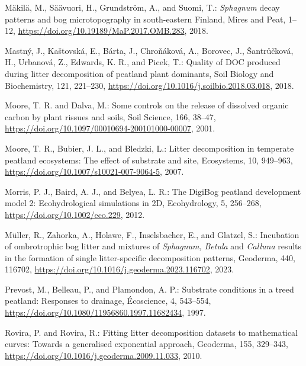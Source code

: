 \documentclass[
  12pt,
]{article}
\newlength{\cslhangindent}
\newlength{\cslentryspacingunit} %
\newenvironment{CSLReferences}[2] %
 {%
  \setlength{\parindent}{0pt}
  \ifodd #1
  \let\oldpar\par
  \def\par{\hangindent=\cslhangindent\oldpar}
  \fi
  \setlength{\parskip}{#2\cslentryspacingunit}
 }%
 {}
\begin{document}
\begin{CSLReferences}{0}{0}
\leavevmode{}%
Mäkilä, M., Säävuori, H., Grundström, A., and Suomi, T.: {\emph{Sphagnum}} decay patterns and bog microtopography in south-eastern {Finland}, Mires and Peat, 1--12, \url{https://doi.org/10.19189/MaP.2017.OMB.283}, 2018.

\leavevmode{}%
Mastný, J., Kaštovská, E., Bárta, J., Chroňáková, A., Borovec, J., Šantrůčková, H., Urbanová, Z., Edwards, K. R., and Picek, T.: Quality of {DOC} produced during litter decomposition of peatland plant dominants, Soil Biology and Biochemistry, 121, 221--230, \url{https://doi.org/10.1016/j.soilbio.2018.03.018}, 2018.

\leavevmode{}%
Moore, T. R. and Dalva, M.: Some controls on the release of dissolved organic carbon by plant rissues and soils, Soil Science, 166, 38--47, \url{https://doi.org/10.1097/00010694-200101000-00007}, 2001.

\leavevmode{}%
Moore, T. R., Bubier, J. L., and Bledzki, L.: Litter decomposition in temperate peatland ecosystems: {The} effect of substrate and site, Ecosystems, 10, 949--963, \url{https://doi.org/10.1007/s10021-007-9064-5}, 2007.

\leavevmode{}%
Morris, P. J., Baird, A. J., and Belyea, L. R.: The {DigiBog} peatland development model 2: Ecohydrological simulations in {2D}, Ecohydrology, 5, 256--268, \url{https://doi.org/10.1002/eco.229}, 2012.

\leavevmode{}%
Müller, R., Zahorka, A., Holawe, F., Inselsbacher, E., and Glatzel, S.: Incubation of ombrotrophic bog litter and mixtures of {\emph{Sphagnum}}{\emph{,} }{\emph{Betula}} and {\emph{Calluna}} results in the formation of single litter-specific decomposition patterns, Geoderma, 440, 116702, \url{https://doi.org/10.1016/j.geoderma.2023.116702}, 2023.

\leavevmode{}%
Prevost, M., Belleau, P., and Plamondon, A. P.: Substrate conditions in a treed peatland: {Responses} to drainage, {É}coscience, 4, 543--554, \url{https://doi.org/10.1080/11956860.1997.11682434}, 1997.

\leavevmode{}%
Rovira, P. and Rovira, R.: Fitting litter decomposition datasets to mathematical curves: {Towards} a generalised exponential approach, Geoderma, 155, 329--343, \url{https://doi.org/10.1016/j.geoderma.2009.11.033}, 2010.


\end{CSLReferences}
\end{document}
